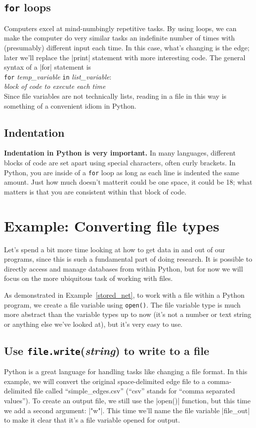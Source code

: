 \documentclass{article}
\begin{document}
\subsection{\texttt{for} loops}
Computers excel at mind-numbingly repetitive tasks.  By using loops, we can make the computer do very similar tasks an indefinite number of times 
with (presumably) different input each time.  In this case, what's changing is the edge; later we'll replace the |print| statement 
with more interesting code.  The general syntax of a |for| statement is\\

\noindent \texttt{for} \textit{temp\_variable} \texttt{in} \textit{list\_variable}:\\
\indent \textit{block of code to execute each time}\\

Since file variables are not technically lists, reading in a file in this way is something of a convenient idiom in Python.

\subsection{Indentation}
\textbf{Indentation in Python is very important.}  In many languages, different
blocks of code are set apart using special characters, often curly brackets.  In
Python, you are inside of a \texttt{for} loop as long as each line is indented the
same amount.  Just how much doesn't matter\textemdash it could be one space, it
could be 18; what matters is that you are consistent within that block of code.

\section{Example: Converting file types}
Let's spend a bit more time looking at how to get data in and out of our programs, since this is such a fundamental part of doing research.
It is possible to directly access and manage databases from within Python, but for now we will focus on the more ubiquitous task of working with files.

As demonstrated in Example~\ref{stored_net}, to work with a file within a Python program, we create a file variable using \texttt{open()}.  The
file variable type is much more abstract than the variable types up to now (it's not a number or text string or anything else we've looked at),
 but it's very easy to use.

\subsection{Use \texttt{file.write}(\textit{string}) to write to a file}
Python is a great language for handling tasks like changing a file format.  In this example, we will convert the original space-delimited edge file
to a comma-delimited file called ``simple\_edges.csv'' (``csv'' stands for ``comma separated values'').  To create an output file, we still
use the |open()| function, but this time we add a second argument: |"w"|.  This
time we'll name the file variable |file_out| to make it clear that it's a file variable opened for output.
\end{document}
